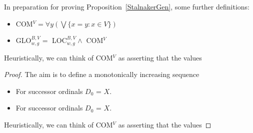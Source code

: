 \documentclass{jphilart}
\begin{document}
In preparation for proving Proposition~\ref{StalnakerGen}, some further definitions:
%
\begin{itemize}
%
\item COM$^V = \forall y (\bigvee\{x = y: x \in V\})$
%
\item GLO$^{B,V}_{w, g} =$ LOC$^{B,V}_{w, g} \wedge$ COM$^V$
\end{itemize}

Heuristically, we can think of COM$^V$ as asserting that the values

\begin{proof}
The aim is to define a monotonically increasing sequence 
\begin{itemize}
\item For successor ordinals $D_0$ = $X$.
\item For successor ordinals $D_0$ = $X$.
\end{itemize}

Heuristically, we can think of COM$^V$ as asserting that the values

\end{proof}
\end{document}
